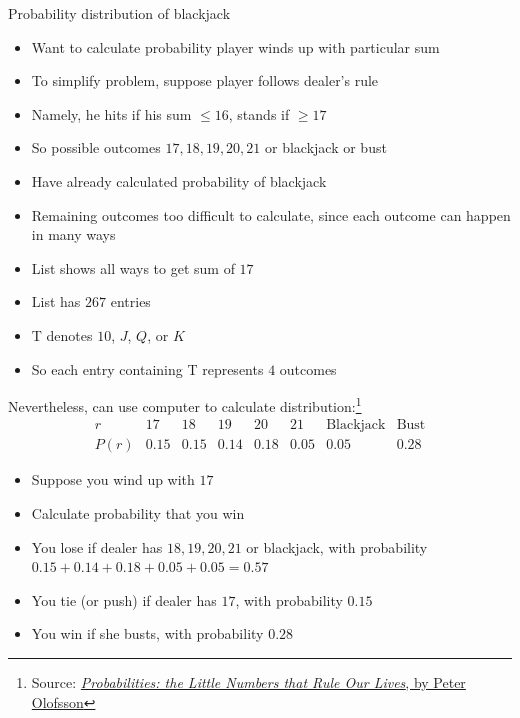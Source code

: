 \documentclass[handout]{beamer}
\theoremstyle{definition}
\begin{document}
\begin{frame}{Probability distribution of blackjack}
\begin{itemize}
\item Want to calculate probability player winds up with particular sum
\item To simplify problem, suppose player follows dealer's rule
\item Namely, he hits if his sum $\le 16$, stands if $\ge 17$
\item So possible outcomes $17,18,19,20,21$ or blackjack or bust
\item Have already calculated probability of blackjack
\item Remaining outcomes too difficult to calculate,
since each outcome can happen in many ways
\end{itemize}
\end{frame}

\begin{frame}
\begin{itemize}
\item List shows all ways to get sum of $17$
\item List has $267$ entries
\item \alert{T} denotes $10$, $J$, $Q$, or $K$
\item So each entry containing \alert{T}
represents $4$ outcomes
\end{itemize}

\end{frame}

\begin{frame}
Nevertheless, can use computer to calculate
distribution:\footnote{Source:
\href{http://www.wiley.com/WileyCDA/WileyTitle/productCd-0470624450.html}
{\color{blue}
{\em Probabilities: the Little Numbers that Rule Our Lives},
by Peter Olofsson}}
\[\begin{array}{r|lllllll}
r&17&18&19&20&21&\text{Blackjack}&\text{Bust}\\\hline
P\left(r\right)&0.15&0.15&0.14&0.18&0.05&0.05&0.28
\end{array}\]
\begin{example}
\begin{itemize}
\item Suppose you wind up with $17$
\item Calculate probability that you win
\item You lose if dealer has $18,19,20,21$ or blackjack, with
probability $0.15+0.14+0.18+0.05+0.05=0.57$
\item You tie (or \alert{push})
if dealer has $17$, with probability $0.15$
\item You win if she busts, with probability $0.28$
\end{itemize}
\end{example}
\end{frame}
\end{document}
